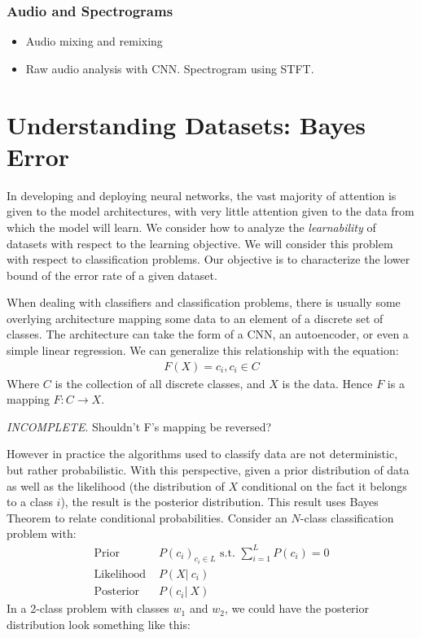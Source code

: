 \documentclass[paper=a4, fontsize=12pt]{scrartcl} %
\numberwithin{equation}{section} %
\numberwithin{figure}{section} %
\numberwithin{table}{section} %
\begin{document}
\subsubsection{Audio and Spectrograms}

\begin{itemize}
    \item Audio mixing and remixing
    \item Raw audio analysis with CNN. Spectrogram using STFT.
\end{itemize}

\pagebreak


\section{Understanding Datasets: Bayes Error}

In developing and deploying neural networks, the vast majority of attention is given to the model architectures, with very little 
attention given to the data from which the model will learn. We consider how to analyze the \textit{learnability} of 
datasets with respect to the learning objective. We will consider this problem with respect to classification problems. 
Our objective is to characterize the lower bound of the error rate of a given dataset.

When dealing with classifiers and classification problems, there is usually some overlying architecture mapping 
some data to an element of a discrete set of classes. The architecture can take the form of a CNN, an autoencoder, 
or even a simple linear regression. We can generalize this relationship with the equation:
\begin{align*}
    F(X) = c_i, c_i\in C
\end{align*}
Where $C$ is the collection of all discrete classes, and $X$ is the data. Hence $F$ is a mapping $F: C \rightarrow X$.

\textit{INCOMPLETE}. Shouldn't F's mapping be reversed?

However in practice the algorithms used to classify data are not deterministic, but rather probabilistic. With this 
perspective, given a prior distribution of data as well as the likelihood (the distribution of $X$ conditional on the fact it 
belongs to a class $i$), the result is the posterior distribution. This result uses Bayes Theorem to relate 
conditional probabilities. Consider an $N$-class classification problem with:
\begin{align*}
    \text{Prior } &P(c_i)_{c_i \in L} \text{ s.t. } \sum_{i=1}^L P(c_i) = 0 \\
    \text{Likelihood } &P(X |\ c_i) \\
    \text{Posterior } &P(c_i |\ X)
\end{align*}
In a 2-class problem with classes $w_1$ and $w_2$, we could have the posterior distribution look something like this: 
\end{document}
